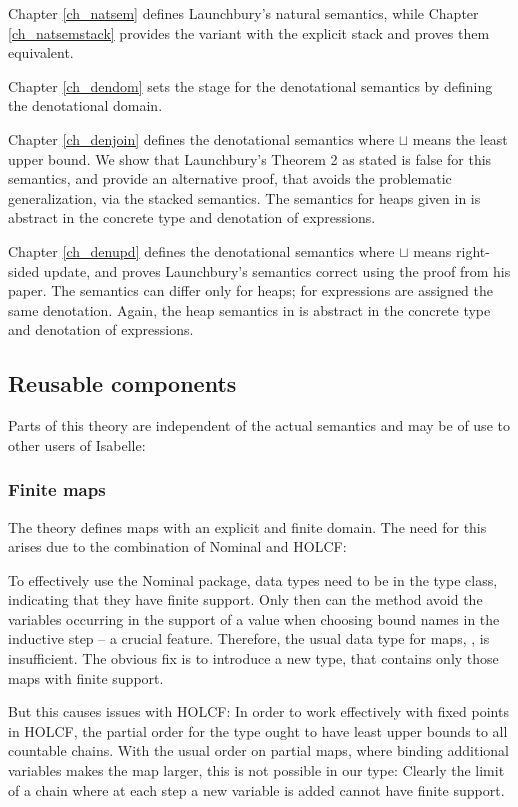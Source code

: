 \documentclass[11pt,a4paper,parskip=half]{scrartcl}
\begin{document}
Chapter \ref{ch_natsem} defines Launchbury's natural semantics, while Chapter \ref{ch_natsemstack} provides the variant with the explicit stack and proves them equivalent.

Chapter \ref{ch_dendom} sets the stage for the denotational semantics by defining the denotational domain.

Chapter \ref{ch_denjoin} defines the denotational semantics where $\sqcup$ means the least upper bound. We show that Launchbury's Theorem 2 as stated is false for this semantics, and provide an alternative proof, that avoids the problematic generalization, via the stacked semantics. The semantics for heaps given in  is abstract in the concrete type and denotation of expressions.

Chapter \ref{ch_denupd} defines the denotational semantics where $\sqcup$ means right-sided update, and proves Launchbury's semantics correct using the proof from his paper. The semantics can differ only for heaps; for expressions are assigned the same denotation. Again, the heap semantics in  is abstract in the concrete type and denotation of expressions.

\subsection{Reusable components}

Parts of this theory are independent of the actual semantics and may be of use to other users of Isabelle:

\subsubsection{Finite maps}

The theory  defines maps with an explicit and finite domain. The need for this arises due to the combination of Nominal and HOLCF:

To effectively use the Nominal package, data types need to be in the  type class, indicating that they have finite support. Only then can the  method avoid the variables occurring in the support of a value when choosing bound names in the inductive step -- a crucial feature. Therefore, the usual data type for maps, , is insufficient. The obvious fix is to introduce a new type,  that contains only those maps with finite support.

But this causes issues with HOLCF: In order to work effectively with fixed points in HOLCF, the partial order for the type ought to have least upper bounds to all countable chains. With the usual order on partial maps, where binding additional variables makes the map larger, this is not possible in our type: Clearly the limit of a chain where at each step a new variable is added cannot have finite support.
\end{document}
